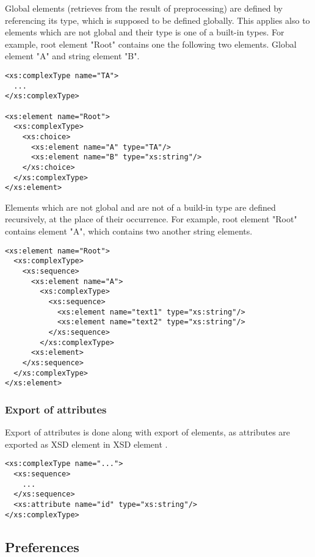 \documentclass[a4paper,10pt,oneside]{article}
\newcommand{\code}[1]{\texttt{\StrSubstitute{#1}{.}{.\.}}}
\def\.{\discretionary{}{}{}}
\begin{document}
Global elements (retrieves from the result of preprocessing) are defined by referencing its type, which is supposed to be defined globally. This applies also to elements which are not global and their type is one of a built-in types. For example, root element "Root" contains one the following two elements. Global element "A" and string element "B".

\begin{verbatim}
<xs:complexType name="TA">
  ...
</xs:complexType>

<xs:element name="Root">
  <xs:complexType>
    <xs:choice>
      <xs:element name="A" type="TA"/>
      <xs:element name="B" type="xs:string"/>
    </xs:choice>
  </xs:complexType>
</xs:element>
\end{verbatim}

Elements which are not global and are not of a build-in type are defined recursively, at the place of their occurrence. For example, root element "Root" contains element "A", which contains two another string elements.

\begin{verbatim}
<xs:element name="Root">
  <xs:complexType>
    <xs:sequence>
      <xs:element name="A">
        <xs:complexType>
          <xs:sequence>
            <xs:element name="text1" type="xs:string"/>
            <xs:element name="text2" type="xs:string"/>
          </xs:sequence>          
        </xs:complexType>
      <xs:element>
    </xs:sequence>
  </xs:complexType>
</xs:element>
\end{verbatim}

\subsubsection{Export of attributes}

Export of attributes is done along with export of elements, as attributes are exported as XSD element \code{xs:attribute} in XSD element \code{xs:complexType}.

\begin{verbatim}
<xs:complexType name="...">
  <xs:sequence>
    ...
  </xs:sequence>
  <xs:attribute name="id" type="xs:string"/>
</xs:complexType>
\end{verbatim}

\subsection{Preferences} \label{subsection:preferences}
\end{document}

